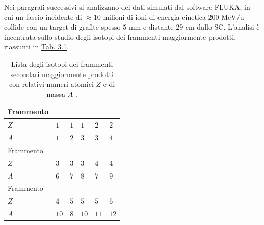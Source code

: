 \documentclass[12pt,a4paper,twoside]{report}
\begin{document}
	Nei paragrafi successivi si analizzano dei dati simulati dal software FLUKA, in cui un fascio incidente di $\approx10$ milioni di ioni  di energia cinetica $200\mbox{ MeV/u}$ collide con un target di grafite spesso $5\mbox{ mm}$ e distante $29 \mbox{ cm}$ dallo SC. L'analisi è incentrata sullo studio degli isotopi dei frammenti maggiormente prodotti, riassunti in \hyperref[tab:fragments]{Tab. 3.1}.
	\begin{table}[H]
		\begin{minipage}{\textwidth}
			\centering
			\begin{tabular}{ |M{2.2cm}||M{1.5cm}|M{1.5cm}|M{1.5cm}|M{1.5cm}|M{1.5cm}| }
				\hline
				Frammento &&&&&\\
				\hline
				$Z$ & $1$& $1$& $1$& $2$& $2$\\
				\hline
				$A$ & $1$& $2$ &$3$ &$3$& $4$\\
				\hline
				\hline
				Frammento &&&&&\\
				\hline
				$Z$ & $3$& $3$& $3$& $4$& $4$\\
				\hline
				$A$ & $6$& $7$ &$8$ &$7$& $9$\\
				\hline
				\hline
				Frammento &&&&&\\
				\hline
				$Z$ & $4$& $5$& $5$& $5$& $6$\\
				\hline
				$A$ & $10$& $8$ &$10$ &$11$& $12$\\
				\hline
			\end{tabular}
		\end{minipage}
		\caption{Lista degli isotopi dei frammenti secondari maggiormente prodotti con relativi numeri atomici $Z$ e di massa $A$ \cite{foot_cdr}.}
		\label{tab:fragments}
	\end{table}
	
\end{document}
